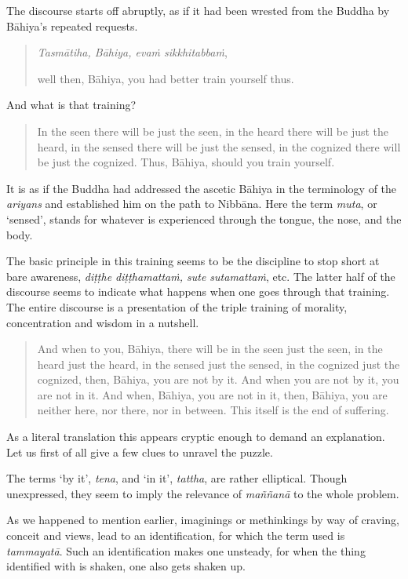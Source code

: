 The discourse starts off abruptly, as if it had been wrested from the Buddha by Bāhiya's repeated requests.

\begin{quote}
\emph{Tasmātiha, Bāhiya, evaṁ sikkhitabbaṁ},

well then, Bāhiya, you had better train yourself thus.
\end{quote}

And what is that training?

\begin{quote}
In the seen there will be just the seen, in the heard there will be just the heard, in the sensed there will be just the sensed, in the cognized there will be just the cognized. Thus, Bāhiya, should you train yourself.
\end{quote}

It is as if the Buddha had addressed the ascetic Bāhiya in the terminology of the \emph{ariyans} and established him on the path to Nibbāna. Here the term \emph{muta}, or `sensed', stands for whatever is experienced through the tongue, the nose, and the body.

The basic principle in this training seems to be the discipline to stop short at bare awareness, \emph{diṭṭhe diṭṭhamattaṁ, sute sutamattaṁ}, etc. The latter half of the discourse seems to indicate what happens when one goes through that training. The entire discourse is a presentation of the triple training of morality, concentration and wisdom in a nutshell.

\begin{quote}
And when to you, Bāhiya, there will be in the seen just the seen, in the heard just the heard, in the sensed just the sensed, in the cognized just the cognized, then, Bāhiya, you are not by it. And when you are not by it, you are not in it. And when, Bāhiya, you are not in it, then, Bāhiya, you are neither here, nor there, nor in between. This itself is the end of suffering.
\end{quote}

As a literal translation this appears cryptic enough to demand an explanation. Let us first of all give a few clues to unravel the puzzle.

The terms `by it', \emph{tena}, and `in it', \emph{tattha}, are rather elliptical. Though unexpressed, they seem to imply the relevance of \emph{maññanā} to the whole problem.

As we happened to mention earlier, imaginings or methinkings by way of craving, conceit and views, lead to an identification, for which the term used is \emph{tammayatā}. Such an identification makes one unsteady, for when the thing identified with is shaken, one also gets shaken up.

